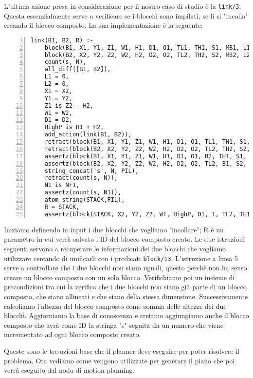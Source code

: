 L'ultima azione presa in considerazione per il nostro caso di studio è la \verb+link/3+. Questa essenzialmente serve a verificare se i blocchi sono impilati, se li si "incolla" creando il blocco composto. La sua implementazione è la seguente:
\begin{lstlisting}[numbers=left]
link(B1, B2, R) :-
    block(B1, X1, Y1, Z1, W1, H1, D1, O1, TL1, TH1, S1, MB1, L1),
    block(B2, X2, Y2, Z2, W2, H2, D2, O2, TL2, TH2, S2, MB2, L2),
    count(s, N),
    all_diff([B1, B2]),
    L1 = 0,
    L2 = 0,
    X1 = X2,
    Y1 = Y2,
    Z1 is Z2 - H2,
    W1 = W2,
    D1 = D2,
    HighP is H1 + H2,
    add_action(link(B1, B2)),
    retract(block(B1, X1, Y1, Z1, W1, H1, D1, O1, TL1, TH1, S1, MB1, L1)),
    retract(block(B2, X2, Y2, Z2, W2, H2, D2, O2, TL2, TH2, S2, MB2, L2)),
    assertz(block(B1, X1, Y1, Z1, W1, H1, D1, O1, B2, TH1, S1, MB1, 1)),
    assertz(block(B2, X2, Y2, Z2, W2, H2, D2, O2, TL2, B1, S2, MB2, 1)),
    string_concat('s', N, PIL),
    retract(count(s, N)),
    N1 is N+1,
    assertz(count(s, N1)),
    atom_string(STACK,PIL),
    R = STACK,
    assertz(block(STACK, X2, Y2, Z2, W1, HighP, D1, 1, TL2, TH1, block, [B1,B2],0)).
\end{lstlisting}
Iniziamo definendo in input i due blocchi che vogliamo "incollare"; R è un parametro in cui verrà salvato l'ID del blocco composto creato.
Le due istruzioni seguenti servono a recuperare le informazioni dei due blocchi che vogliamo utilizzare cercando di unificarli con i predicati \verb+block/13+.
L'istruzione a linea 5 serve a controllare che i due blocchi non siano uguali, questo perchè non ha senso creare un blocco composto con un solo blocco. Verifichiamo poi un insieme di precondizioni tra cui la verifica che i due blocchi non siano già parte di un blocco composto, che siano allineati e che siano della stessa dimensione.
Successivamente calcoliamo l'altezza del blocco composto come somma delle altezze dei due blocchi. Aggiorniamo la base di conoscenza e creiamo aggiungiamo anche il blocco composto che avrà come ID la stringa "s" seguita da un numero che viene incrementato ad ogni blocco composto creato.

Queste sono le tre azioni base che il planner deve eseguire per poter risolvere il problema. Ora vediamo come vengono utilizzate per generare il piano che poi verrà eseguito dal nodo di motion planning.
